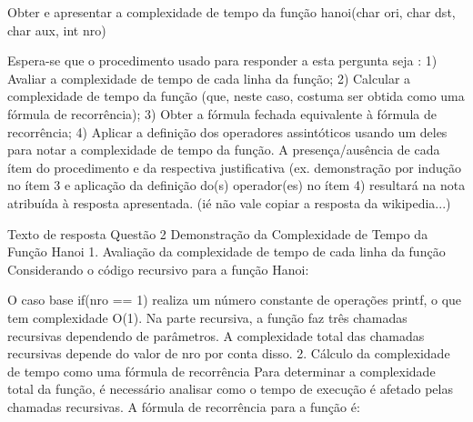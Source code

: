 Obter e apresentar a complexidade de tempo da função hanoi(char ori, char dst, char aux, int nro)

   Espera-se que o procedimento usado para responder a esta pergunta seja : 1) Avaliar a complexidade de tempo de cada linha da função; 2) Calcular a complexidade de tempo da função (que, neste caso, costuma ser obtida como uma fórmula de recorrência); 3) Obter a fórmula fechada equivalente à fórmula de recorrência; 4) Aplicar a definição dos operadores assintóticos usando um deles para notar a complexidade de tempo da função. 
    A presença/ausência de cada ítem do procedimento e da respectiva justificativa (ex. demonstração por indução no ítem 3 e aplicação da definição do(s) operador(es) no ítem 4) resultará na nota atribuída à resposta apresentada. (ié não vale copiar a resposta da wikipedia...)



Texto de resposta Questão 2
Demonstração da Complexidade de Tempo da Função Hanoi
1. Avaliação da complexidade de tempo de cada linha da função
Considerando o código recursivo para a função Hanoi:

O caso base if(nro == 1) realiza um número constante de operações printf, o que tem complexidade O(1).
Na parte recursiva, a função faz três chamadas recursivas dependendo de parâmetros. A complexidade total das chamadas recursivas depende do valor de nro por conta disso.
2. Cálculo da complexidade de tempo como uma fórmula de recorrência
Para determinar a complexidade total da função, é necessário analisar como o tempo de execução é afetado pelas chamadas recursivas. A fórmula de recorrência para a função é:

